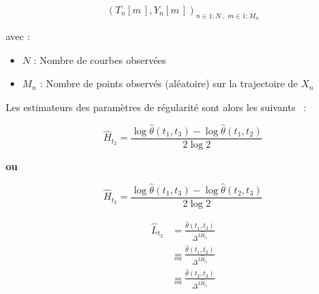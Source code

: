\begin{equation*}
	( T_n[ m \,], Y_n[ m \,] )_{{n \in 1:N} \; , \; {m \in 1:M_n}}
\end{equation*}

avec :

\begin{itemize}
	\item $N$ : Nombre de courbes observées
	\item $M_n$ : Nombre de points observés (aléatoire) sur la trajectoire de $X_n$
\end{itemize}

Les estimateurs des paramètres de régularité sont alors les suivants ~\cite{maissoro-SmoothnessFTSweakDep}:

\begin{definition}
	\phantom{.}

	\begin{minipage}{0.5\textwidth}
		\begin{equation}
			\hat H_{t_2} = \frac{ \log \hat \theta(t_1, t_3) - \log \hat \theta(t_1, t_2) }{2 \log 2}
			\label{eq:H_13_12}
		\end{equation}

		\begin{center}
		\textbf{ou}
		\end{center}

		\begin{equation}
			\hat H_{t_2} = \frac{ \log \hat \theta(t_1, t_3) - \log \hat \theta(t_2, t_3) }{2 \log 2}
			\label{eq:H_13_23}
		\end{equation}
	\end{minipage}
	\begin{minipage}{0.5\textwidth}
		\begin{align}
			\widehat L_{t_2} & = \frac{\widehat \theta(t_1, t_3)}{\Delta^{2 \widehat H_{t_2}}}
			\\ &\underset{ou}= \frac{\widehat \theta(t_1, t_2)}{\Delta^{2 \widehat H_{t_2}}}
			\\ &\underset{ou}= \frac{\widehat \theta(t_2, t_3)}{\Delta^{2 \widehat H_{t_2}}}
		\end{align}
	\end{minipage}
	\label{def:estim_reg}
\end{definition}
